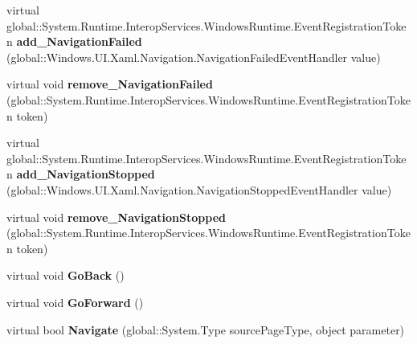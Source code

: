 \begin{DoxyCompactItemize}
virtual global\+::\+System.\+Runtime.\+Interop\+Services.\+Windows\+Runtime.\+Event\+Registration\+Token {\bfseries add\+\_\+\+Navigation\+Failed} (global\+::\+Windows.\+U\+I.\+Xaml.\+Navigation.\+Navigation\+Failed\+Event\+Handler value)
\item 
\mbox{\label{class_windows_1_1_u_i_1_1_xaml_1_1_controls_1_1_frame_a5d519629c46865af9d6caf0f44a517fd}} 
virtual void {\bfseries remove\+\_\+\+Navigation\+Failed} (global\+::\+System.\+Runtime.\+Interop\+Services.\+Windows\+Runtime.\+Event\+Registration\+Token token)
\item 
\mbox{\label{class_windows_1_1_u_i_1_1_xaml_1_1_controls_1_1_frame_a6bf2da59d0a90e490aecaa3f355783ac}} 
virtual global\+::\+System.\+Runtime.\+Interop\+Services.\+Windows\+Runtime.\+Event\+Registration\+Token {\bfseries add\+\_\+\+Navigation\+Stopped} (global\+::\+Windows.\+U\+I.\+Xaml.\+Navigation.\+Navigation\+Stopped\+Event\+Handler value)
\item 
\mbox{\label{class_windows_1_1_u_i_1_1_xaml_1_1_controls_1_1_frame_a18e9954aafd2a9225401b40871f4f115}} 
virtual void {\bfseries remove\+\_\+\+Navigation\+Stopped} (global\+::\+System.\+Runtime.\+Interop\+Services.\+Windows\+Runtime.\+Event\+Registration\+Token token)
\item 
\mbox{\label{class_windows_1_1_u_i_1_1_xaml_1_1_controls_1_1_frame_aa208a306e405ff8aad9dc0a19d722b18}} 
virtual void {\bfseries Go\+Back} ()
\item 
\mbox{\label{class_windows_1_1_u_i_1_1_xaml_1_1_controls_1_1_frame_a77897d1c6e165763d79d0444353627b6}} 
virtual void {\bfseries Go\+Forward} ()
\item 
\mbox{\label{class_windows_1_1_u_i_1_1_xaml_1_1_controls_1_1_frame_aa88f5dbc5d0be1aa7a6d29db649b5d3b}} 
virtual bool {\bfseries Navigate} (global\+::\+System.\+Type source\+Page\+Type, object parameter)
\item 
\mbox{\label{class_windows_1_1_u_i_1_1_xaml_1_1_controls_1_1_frame_a61a9544723df665a3302a9c9787d26e5}} 

\end{DoxyCompactItemize}
